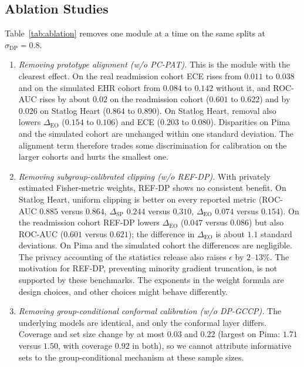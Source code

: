 \documentclass[pdflatex,sn-vancouver-num,referee,lineno]{sn-jnl}
\theoremstyle{thmstyleone}
\theoremstyle{thmstylethree}
\begin{document}
\subsection{Ablation Studies}
Table~\ref{tab:ablation} removes one module at a time on the same splits at $\sigma_{\text{DP}}=0.8$.
\begin{enumerate}
    \item \emph{Removing prototype alignment (w/o PC-PAT).} This is the module with the clearest effect. On the real readmission cohort ECE rises from $0.011$ to $0.038$ and on the simulated EHR cohort from $0.084$ to $0.142$ without it, and ROC-AUC rises by about $0.02$ on the readmission cohort ($0.601$ to $0.622$) and by $0.026$ on Statlog Heart ($0.864$ to $0.890$). On Statlog Heart, removal also lowers $\Delta_{\text{EO}}$ ($0.154$ to $0.106$) and ECE ($0.203$ to $0.080$). Disparities on Pima and the simulated cohort are unchanged within one standard deviation. The alignment term therefore trades some discrimination for calibration on the larger cohorts and hurts the smallest one.
    \item \emph{Removing subgroup-calibrated clipping (w/o REF-DP).} With privately estimated Fisher-metric weights, REF-DP shows no consistent benefit. On Statlog Heart, uniform clipping is better on every reported metric (ROC-AUC $0.885$ versus $0.864$, $\Delta_{\text{SP}}$ $0.244$ versus $0.310$, $\Delta_{\text{EO}}$ $0.074$ versus $0.154$). On the readmission cohort REF-DP lowers $\Delta_{\text{EO}}$ ($0.047$ versus $0.086$) but also ROC-AUC ($0.601$ versus $0.621$); the difference in $\Delta_{\text{EO}}$ is about $1.1$ standard deviations. On Pima and the simulated cohort the differences are negligible. The privacy accounting of the statistics release also raises $\epsilon$ by $2$--$13\%$. The motivation for REF-DP, preventing minority gradient truncation, is not supported by these benchmarks. The exponents in the weight formula are design choices, and other choices might behave differently.
    \item \emph{Removing group-conditional conformal calibration (w/o DP-GCCP).} The underlying models are identical, and only the conformal layer differs. Coverage and set size change by at most $0.03$ and $0.22$ (largest on Pima: $1.71$ versus $1.50$, with coverage $0.92$ in both), so we cannot attribute informative sets to the group-conditional mechanism at these sample sizes.
\end{enumerate}
\end{document}
